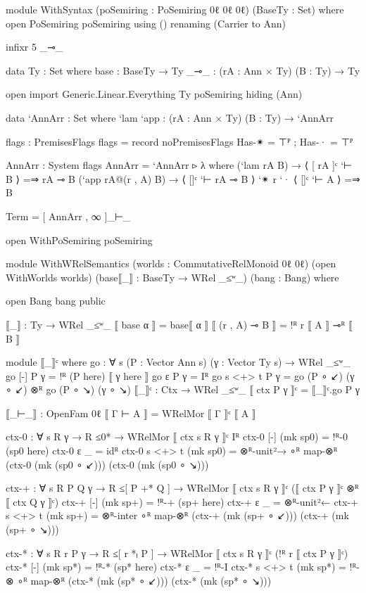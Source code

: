\begin{code}
  module WithSyntax (poSemiring : PoSemiring 0ℓ 0ℓ 0ℓ) (BaseTy : Set) where
    open PoSemiring poSemiring using () renaming (Carrier to Ann)

    infixr 5 _⊸_

    data Ty : Set where
      base : BaseTy → Ty
      _⊸_ : (rA : Ann × Ty) (B : Ty) → Ty

    open import Generic.Linear.Everything Ty poSemiring hiding (Ann)

    data `AnnArr : Set where
      `lam `app : (rA : Ann × Ty) (B : Ty) → `AnnArr

    flags : PremisesFlags
    flags = record noPremisesFlags { Has-✴ = ⊤ᴾ ; Has-· = ⊤ᴾ }

    AnnArr : System flags
    AnnArr = `AnnArr ▹ λ where
      (`lam rA B) → ⟨ [ rA ]ᶜ `⊢ B ⟩ =⇒ rA ⊸ B
      (`app rA@(r , A) B) → ⟨ []ᶜ `⊢ rA ⊸ B ⟩ `✴ r `· ⟨ []ᶜ `⊢ A ⟩ =⇒ B

    Term = [ AnnArr , ∞ ]_⊢_

    open WithPoSemiring poSemiring

    module WithWRelSemantics
      (worlds : CommutativeRelMonoid 0ℓ 0ℓ) (open WithWorlds worlds)
      (base⟦_⟧ : BaseTy → WRel _≤ʷ_) (bang : Bang)
      where

      open Bang bang public

      ⟦_⟧ : Ty → WRel _≤ʷ_
      ⟦ base α ⟧ = base⟦ α ⟧
      ⟦ (r , A) ⊸ B ⟧ = !ᴿ r ⟦ A ⟧ ⊸ᴿ ⟦ B ⟧

      module ⟦_⟧ᶜ where
        go : ∀ {s} (P : Vector Ann s) (γ : Vector Ty s) → WRel _≤ʷ_
        go {[-]} P γ = !ᴿ (P here) ⟦ γ here ⟧
        go {ε} P γ = Iᴿ
        go {s <+> t} P γ = go (P ∘ ↙) (γ ∘ ↙) ⊗ᴿ go (P ∘ ↘) (γ ∘ ↘)
      ⟦_⟧ᶜ : Ctx → WRel _≤ʷ_
      ⟦ ctx P γ ⟧ᶜ = ⟦_⟧ᶜ.go P γ

      ⟦_⊢_⟧ : OpenFam 0ℓ
      ⟦ Γ ⊢ A ⟧ = WRelMor ⟦ Γ ⟧ᶜ ⟦ A ⟧

      ctx-0 : ∀ {s R γ} → R ≤0* → WRelMor ⟦ ctx {s} R γ ⟧ᶜ Iᴿ
      ctx-0 {[-]} (mk sp0) = !ᴿ-0 (sp0 here)
      ctx-0 {ε} _ = idᴿ
      ctx-0 {s <+> t} (mk sp0) =
        ⊗ᴿ-unit²→ ∘ᴿ map-⊗ᴿ (ctx-0 (mk (sp0 ∘ ↙))) (ctx-0 (mk (sp0 ∘ ↘)))

      ctx-+ : ∀ {s R P Q γ} → R ≤[ P +* Q ] →
        WRelMor ⟦ ctx {s} R γ ⟧ᶜ (⟦ ctx P γ ⟧ᶜ ⊗ᴿ ⟦ ctx Q γ ⟧ᶜ)
      ctx-+ {[-]} (mk sp+) = !ᴿ-+ (sp+ here)
      ctx-+ {ε} _ = ⊗ᴿ-unit²←
      ctx-+ {s <+> t} (mk sp+) =
        ⊗ᴿ-inter ∘ᴿ map-⊗ᴿ (ctx-+ (mk (sp+ ∘ ↙))) (ctx-+ (mk (sp+ ∘ ↘)))

      ctx-* : ∀ {s R r P γ} → R ≤[ r *ₗ P ] →
        WRelMor ⟦ ctx {s} R γ ⟧ᶜ (!ᴿ r ⟦ ctx P γ ⟧ᶜ)
      ctx-* {[-]} (mk sp*) = !ᴿ-* (sp* here)
      ctx-* {ε} _ = !ᴿ-I
      ctx-* {s <+> t} (mk sp*) =
        !ᴿ-⊗ ∘ᴿ map-⊗ᴿ (ctx-* (mk (sp* ∘ ↙))) (ctx-* (mk (sp* ∘ ↘)))


\end{code}
